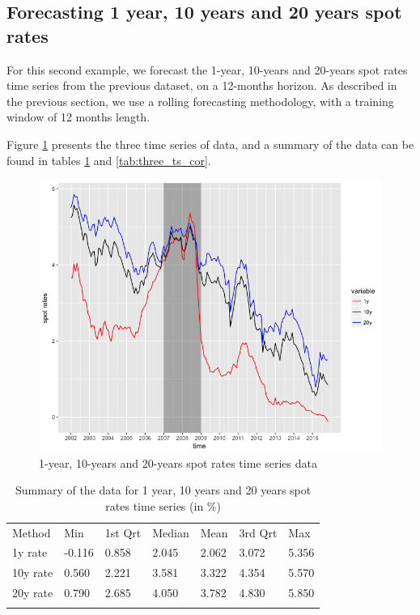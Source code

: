 \subsection{Forecasting 1 year, 10 years and 20 years spot rates}

For this second example, we forecast the 1-year, 10-years and 20-years spot rates time series from the previous dataset, on a 12-months horizon. As described in the previous section, we use a rolling forecasting methodology, with a training window of 12 months length.

\medskip

Figure \ref{ex2_data} presents the three time series of data, and a summary of the data can be found in tables \ref{tab:three_ts} and \ref{tab:three_ts_cor}.

\begin{figure}
\centering
\includegraphics[width=12cm]{gfx/chapter-rvfl-mts/ex2_data.png}
\caption{1-year, 10-years and 20-years spot rates time series data}
\label{ex2_data}
\end{figure}

\begin{table}[!htb]
\begin{center}
\caption{Summary of the data for 1 year, 10 years and 20 years spot rates time series (in \%)}
\label{tab:three_ts}       %
\begin{tabular}{lllllll}
\hline\noalign{\smallskip}
Method & Min & 1st Qrt  & Median & Mean  & 3rd Qrt  & Max  \\
\noalign{\smallskip}\hline\noalign{\smallskip}
  1y rate & -0.116 & 0.858 & 2.045 & 2.062 & 3.072 & 5.356 \\
  10y rate & 0.560 & 2.221 & 3.581 & 3.322 & 4.354 & 5.570\\
  20y rate & 0.790 & 2.685 & 4.050 & 3.782 & 4.830 & 5.850\\
\noalign{\smallskip}\hline
\end{tabular}
\end{center}
\end{table}

